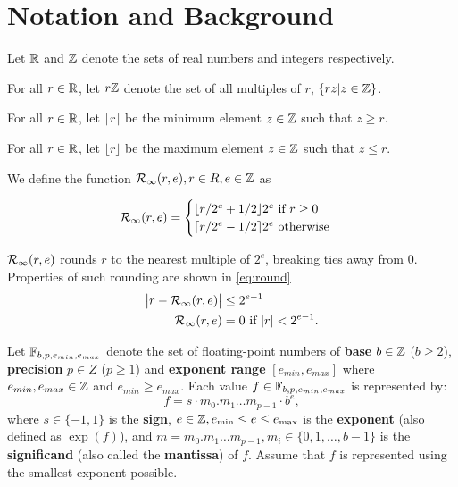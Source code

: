 \section{Notation and Background}
  \label{sec:notation}
  Let $\mathbb{R}$ and $\mathbb{Z}$ denote the sets of real numbers and integers respectively.

  For all $r \in \mathbb{R}$, let $r\mathbb{Z}$ denote the set of all multiples of $r$,
  $\{rz | z \in \mathbb{Z}\}$.

  For all $r \in \mathbb{R}$, let $\lceil r \rceil$ be the minimum element $z \in \mathbb{Z}$
  such that $z \geq r$.

  For all $r \in \mathbb{R}$, let $\lfloor r \rfloor$ be the maximum element $z \in \mathbb{Z}$
  such that $z \leq r$.

  We define the function $\mathcal{R}_\text{$\infty$}(r, e), r \in R, e \in \mathbb{Z}$ as

  \begin{equation}
    \mathcal{R}_\text{$\infty$}(r, e) = \begin{cases}
        \lfloor r/2^e + 1/2 \rfloor 2^e \text{ if } r \geq 0\\
        \lceil r/2^e - 1/2 \rceil 2^e \text{ otherwise}
    \end{cases}
  \end{equation}

  $\mathcal{R}_\text{$\infty$}(r, e)$ rounds $r$ to the nearest multiple of $2^e$,
  breaking ties away from 0. Properties of such rounding are shown in
  \eqref{eq:round}
  \begin{equation}
    \begin{aligned}
    \bigl|r - \mathcal{R}_\text{$\infty$}(r, e)\bigr| & \leq 2^{e - 1} \\
    \mathcal{R}_\text{$\infty$}(r,e) & = 0 \text{ if } |r| < 2^{e-1}.
    \end{aligned}
    \label{eq:round}
  \end{equation}

  Let $\mathbb{F}_{b,p,e_{min},e_{max}}$ denote the set of floating-point numbers
  of \textbf{base} $b \in \mathbb{Z}$ ($b \geq 2$),
  \textbf{precision} $p \in Z$ ($p \geq 1$) and \textbf{exponent range} $[e_{min}, e_{max}]$
  where $e_{min}, e_{max} \in \mathbb{Z}$ and $e_{min} \geq e_{max}$.
  Each value $f \in \mathbb{F}_{b,p,e_{min},e_{max}}$ is represented by:
  \[
    f = s \cdot m_0.m_1 \ldots m_{p-1} \cdot b^e,
  \]
  where $s \in \{-1,1 \}$ is the \textbf{sign},
  $e \in \mathbb{Z}, e_{\min} \leq e \leq e_{\max}$ is the \textbf{exponent}
  (also defined as $\exp(f)$),
  and $m = m_0.m_1 \ldots m_{p-1}, m_i \in \{ 0, 1, \ldots, b-1 \}$
  is the \textbf{significand} (also called the \textbf{mantissa}) of $f$. Assume that $f$ is represented using the smallest exponent possible.

